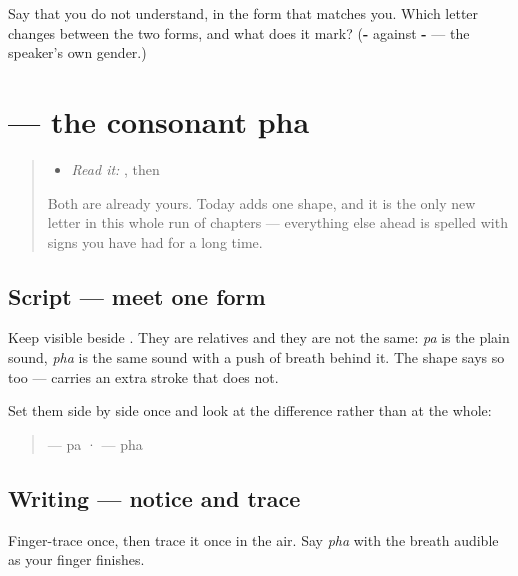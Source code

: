 \begin{tcolorbox}[breakable,colback=teal!4,colframe=teal!35!black,title={Before you move on}]
Say that you do not understand, in the form that matches you. Which letter changes between the two forms, and what does it mark? (\textbf{-} against \textbf{-} — the speaker's own gender.)
\end{tcolorbox}
\section[\texorpdfstring{\gu{ફ} (pha)}{ફ (pha)}]{ — the consonant pha}

\label{lesson:GU-W08-pha}



\begin{quote}
\begin{itemize}
\raggedright
  \item \emph{Read it:} \textbf{}, then \textbf{}
\end{itemize}

Both are already yours. Today adds one shape, and it is the only new letter in this whole run of chapters — everything else ahead is spelled with signs you have had for a long time.
\end{quote}

\subsection*{Script — meet one form}
Keep \textbf{} visible beside \textbf{}. They are relatives and they are not the same: \emph{pa} is the plain sound, \emph{pha} is the same sound with a push of breath behind it. The shape says so too — \textbf{} carries an extra stroke that \textbf{} does not.

Set them side by side once and look at the difference rather than at the whole:

\begin{quote}
\textbf{} — pa · \textbf{} — pha
\end{quote}

\subsection*{Writing — notice and trace}

Finger-trace \textbf{} once, then trace it once in the air. Say \emph{pha} with the breath audible as your finger finishes.

